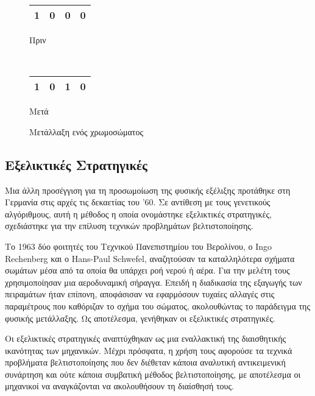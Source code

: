 \begin{figure}[!t]
    \centering
    \begin{subtable}[b]{.4\linewidth}
        \centering
        \begin{tabular}{|c|c|c|c|}
            \hline
            1 & 0 & \cellcolor{gray!25}0 & 0\\
            \hline
        \end{tabular}
        \caption{Πριν}
        \label{fig_beforeMutation}
    \end{subtable}
    ~
    \begin{subtable}[b]{.3\linewidth}
        \centering
        \begin{tabular}{|c|c|c|c|}
            \hline
            1 & 0 & \cellcolor{gray!25}1 & 0\\
            \hline
        \end{tabular}
        \caption{Μετά}
        \label{fig_afterMutation}
    \end{subtable}
    \caption{Μετάλλαξη ενός χρωμοσώματος}
    \label{fig_mutation}
\end{figure} 

\subsection{Εξελικτικές Στρατηγικές}
Μια άλλη προσέγγιση για τη προσωμοίωση της φυσικής εξέλιξης προτάθηκε στη Γερμανία στις αρχές τις δεκαετίας του '60. Σε αντίθεση με τους γενετικούς αλγόριθμους, αυτή η μέθοδος η οποία ονομάστηκε εξελικτικές στρατηγικές, σχεδιάστηκε για την επίλυση τεχνικών προβλημάτων βελτιστοποίησης.

Το 1963 δύο φοιτητές του Τεχνικού Πανεπιστημίου του Βερολίνου, ο Ingo Rechenberg και ο Hans-Paul Schwefel, αναζητούσαν τα καταλληλότερα σχήματα σωμάτων μέσα από τα οποία θα υπάρχει ροή νερού ή αέρα. Για την μελέτη τους χρησιμοποίησαν μια αεροδυναμική σήραγγα. Επειδή η διαδικασία της εξαγωγής των πειραμάτων ήταν επίπονη, αποφάσισαν να εφαρμόσουν τυχαίες αλλαγές στις παραμέτρους που καθόριζαν το σχήμα του σώματος, ακολουθώντας το παράδειγμα της φυσικής μετάλλαξης. Ως αποτέλεσμα, γενήθηκαν οι εξελικτικές στρατηγικές.

Οι εξελικτικές στρατηγικές αναπτύχθηκαν ως μια εναλλακτική της διαισθητικής ικανότητας των μηχανικών. Μέχρι πρόσφατα, η χρήση τους αφορούσε τα τεχνικά προβλήματα βελτιστοποίησης που δεν διέθεταν κάποια αναλυτική αντικειμενική συνάρτηση και ούτε κάποια συμβατική μέθοδος βελτιστοποίησης, με αποτέλεσμα οι μηχανικοί να αναγκάζονται να ακολουθήσουν τη διαίσθησή τους.

